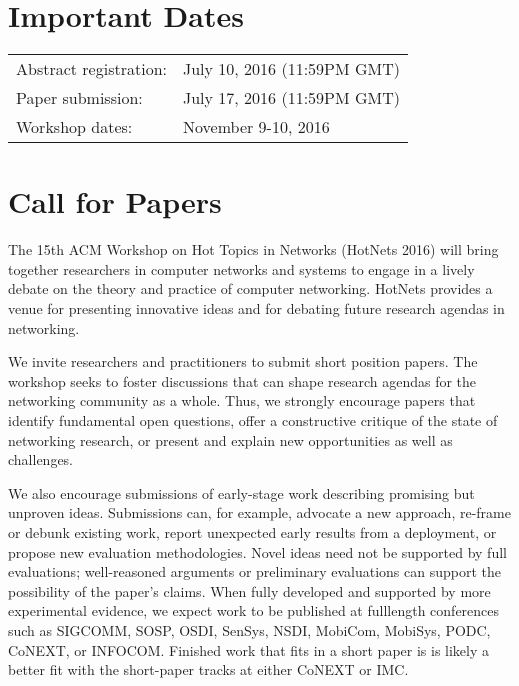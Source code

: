 \documentclass{hotnets16}
\begin{document}
\section{Important Dates}

{
\small 
\begin{tabular}{ll}
Abstract registration: 	        & July 10, 2016 (11:59PM GMT) \\
Paper submission: 	        & July 17, 2016 (11:59PM GMT) \\
Workshop dates: 	        & November 9-10, 2016 \\
\end{tabular}
}

\section{Call for Papers}

The 15th ACM Workshop on Hot Topics in Networks (HotNets 2016) will
bring together researchers in computer networks and systems to engage
in a lively debate on the theory and practice of computer networking.
HotNets provides a venue for presenting innovative ideas
and for debating future research agendas in networking.

We invite researchers and practitioners to submit short position
papers. The workshop seeks to foster discussions
that can shape research agendas for the networking community as a
whole. Thus, we strongly encourage papers that identify fundamental
open questions, offer a constructive critique of the state of
networking research, or present and explain new opportunities as well
as challenges.

We also encourage submissions of early-stage work describing promising
but unproven ideas. Submissions can, for example, advocate a new
approach, re-frame or debunk existing work, report unexpected early
results from a deployment, or propose new evaluation
methodologies. Novel ideas need not be supported by full evaluations;
well-reasoned arguments or preliminary
evaluations can support the possibility of the paper’s claims.
When fully developed and supported by more experimental
evidence, we expect work to be published at fulllength conferences
such as SIGCOMM, SOSP, OSDI, SenSys, NSDI, MobiCom, MobiSys, PODC,
CoNEXT, or INFOCOM. Finished work that fits in a short paper is
is likely a better fit with the short-paper tracks at either CoNEXT or IMC.
\end{document}
